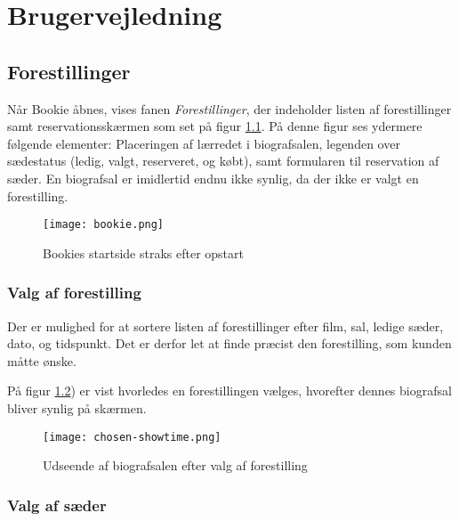 \chapter{Brugervejledning}

\section{Forestillinger}

Når Bookie åbnes, vises fanen \textit{Forestillinger}, der indeholder listen af forestillinger samt reservationsskærmen som set på figur \ref{screenshot:bookie}. På denne figur ses ydermere følgende elementer: Placeringen af lærredet i biografsalen, legenden over sædestatus (ledig, valgt, reserveret, og købt), samt formularen til reservation af sæder. En biografsal er imidlertid endnu ikke synlig, da der ikke er valgt en forestilling.

\begin{figure}[h]
  \centering
  \texttt{[image: bookie.png]}
  \caption{Bookies startside straks efter opstart}
  \label{screenshot:bookie}
\end{figure}

\subsection{Valg af forestilling}

Der er mulighed for at sortere listen af forestillinger efter film, sal, ledige sæder, dato, og tidspunkt. Det er derfor let at finde præcist den forestilling, som kunden måtte ønske.


På figur \ref{screenshot:chosen-showtime}) er vist hvorledes en forestillingen vælges, hvorefter dennes biografsal bliver synlig på skærmen.

\begin{figure}[h]
  \centering
  \texttt{[image: chosen-showtime.png]}
  \caption{Udseende af biografsalen efter valg af forestilling}
  \label{screenshot:chosen-showtime}
\end{figure}

\subsection{Valg af sæder}


